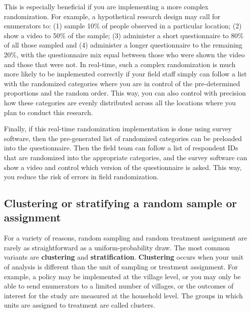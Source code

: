 This is especially beneficial if you are implementing a more complex randomization.
For example, a hypothetical research design may call for enumerators to:
(1) sample 10\% of people observed in a particular location;
(2) show a video to 50\% of the sample;
(3) administer a short questionnaire to 80\% of all those sampled
and (4) administer a longer questionnaire to the remaining 20\%,
with the questionnaire mix equal between those who were shown the video and those that were not.
In real-time, such a complex randomization is much more likely to be implemented correctly
if your field staff simply can follow a list with the randomized categories
where you are in control of the pre-determined proportions and the random order.
This way, you can also control with precision
how these categories are evenly distributed across all the locations
where you plan to conduct this research.

Finally, if this real-time randomization implementation is done using survey software,
then the pre-generated list of randomized categories can be preloaded
into the questionnaire.
Then the field team can follow a list of respondent IDs
that are randomized into the appropriate categories,
and the survey software can show a video and control which version of the questionnaire is asked.
This way, you reduce the risk of errors in field randomization.



\subsection{Clustering or stratifying a random sample or assignment}

For a variety of reasons, random sampling and random treatment assignment
are rarely as straightforward as a uniform-probability draw.
The most common variants are \textbf{clustering} and \textbf{stratification}.
\textbf{Clustering} occurs when your unit of analysis is different
than the unit of sampling or treatment assignment.
For example, a policy may be implemented at the village level,
or you may only be able to send enumerators to a limited number of villages,
or the outcomes of interest for the study are measured at the household level.
The groups in which units are assigned to treatment are called clusters.

